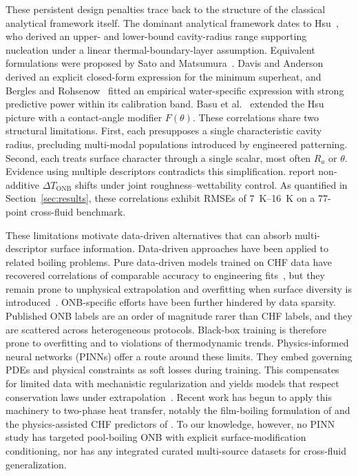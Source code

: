 These persistent design penalties trace back to the structure of the
classical analytical framework itself.
The dominant analytical framework dates to Hsu~\citep{hsu1962}, who
derived an upper- and lower-bound cavity-radius range supporting
nucleation under a linear thermal-boundary-layer assumption. Equivalent
formulations were proposed by Sato and Matsumura~\citep{sato1964}.
Davis and Anderson~\citep{davis1966} derived an explicit closed-form
expression for the minimum superheat, and Bergles and
Rohsenow~\citep{bergles1964} fitted an empirical water-specific
expression with strong predictive power within its calibration band.
Basu et al.~\citep{basu2002} extended the Hsu picture with a
contact-angle modifier $F(\theta)$. These correlations share two
structural limitations. First, each presupposes a single characteristic
cavity radius, precluding multi-modal populations introduced by
engineered patterning. Second, each treats surface character through a
single scalar, most often $R_a$ or $\theta$. Evidence using multiple
descriptors contradicts this
simplification. \citet{jones2009,jabardo2009,betz2013} report
non-additive $\Delta T_{\mathrm{ONB}}$ shifts under joint
roughness--wettability control. As quantified in Section~\ref{sec:results}, these correlations
exhibit RMSEs of \SIrange{7}{16}{K} on a 77-point cross-fluid
benchmark.

These limitations motivate data-driven alternatives that can absorb
multi-descriptor surface information.
Data-driven approaches have been applied to related boiling problems.
Pure data-driven models trained on CHF data have recovered
correlations of comparable accuracy to engineering
fits~\citep{hobold2018,huang2024bubble}, but they remain prone to
unphysical extrapolation and overfitting when surface diversity is
introduced~\citep{li2025cryogenic}. ONB-specific efforts have been
further hindered by data sparsity. Published ONB labels are an order
of magnitude rarer than CHF labels, and they are scattered across
heterogeneous protocols. Black-box training is therefore prone to
overfitting and to violations of thermodynamic trends.
Physics-informed neural networks (PINNs)
\citep{raissi2019,lu2021,cai2021} offer a route around these limits.
They embed governing PDEs and physical constraints as soft losses
during training. This compensates for limited data with mechanistic
regularization and yields models that respect conservation laws under
extrapolation~\citep{zobeiry2021}. Recent work has begun to apply this
machinery to two-phase heat transfer, notably the film-boiling
formulation of \citet{jalili2025pinn} and the physics-assisted CHF
predictors of \citet{li2025cryogenic}. To our knowledge, however, no
PINN study has targeted pool-boiling ONB with explicit
surface-modification conditioning, nor has any integrated curated
multi-source datasets for cross-fluid generalization.

